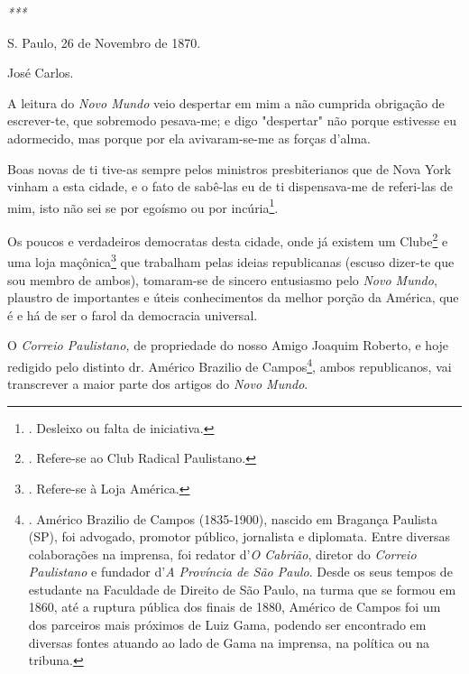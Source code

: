 \emph{***}

S. Paulo, 26 de Novembro de 1870.

José Carlos.

A leitura do \emph{Novo Mundo} veio despertar em mim a não cumprida
obrigação de escrever-te, que sobremodo pesava-me; e digo "despertar"
não porque estivesse eu adormecido, mas porque por ela avivaram-se-me as
forças d'alma.

Boas novas de ti tive-as sempre pelos ministros presbiterianos que de
Nova York vinham a esta cidade, e o fato de sabê-las eu de ti
dispensava-me de referi-las de mim, isto não sei se por egoísmo ou por
incúria\footnote{. Desleixo ou falta de iniciativa.}.

Os poucos e verdadeiros democratas desta cidade, onde já existem um
Clube\footnote{. Refere-se ao Club Radical Paulistano.} e uma loja
maçônica\footnote{. Refere-se à Loja América.} que trabalham pelas
ideias republicanas (escuso dizer-te que sou membro de ambos),
tomaram-se de sincero entusiasmo pelo \emph{Novo Mundo}, plaustro de
importantes e úteis conhecimentos da melhor porção da América, que é e
há de ser o farol da democracia universal.

O \emph{Correio Paulistano,} de propriedade do nosso Amigo Joaquim
Roberto, e hoje redigido pelo distinto dr. Américo Brazilio de
Campos\footnote{. Américo Brazilio de Campos (1835-1900), nascido em
  Bragança Paulista (SP), foi advogado, promotor público, jornalista e
  diplomata. Entre diversas colaborações na imprensa, foi redator
  d'\emph{O Cabrião}, diretor do \emph{Correio Paulistano} e fundador
  d'\emph{A Província de São Paulo}. Desde os seus tempos de estudante
  na Faculdade de Direito de São Paulo, na turma que se formou em 1860,
  até a ruptura pública dos finais de 1880, Américo de Campos foi um dos
  parceiros mais próximos de Luiz Gama, podendo ser encontrado em
  diversas fontes atuando ao lado de Gama na imprensa, na política ou na
  tribuna.}, ambos republicanos, vai transcrever a maior parte dos
artigos do \emph{Novo Mundo}.

